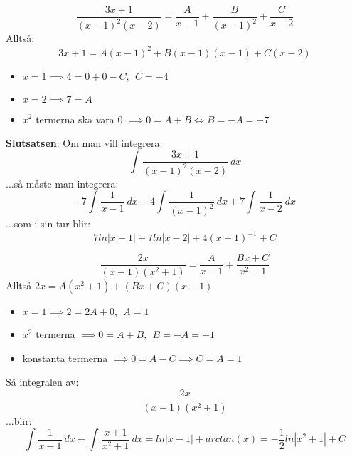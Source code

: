 \documentclass{report}
\begin{document}
\pagebreak

\ex{}
{
\begin{equation*}
\frac{3x+1}{(x-1)^2(x-2)} = \frac{A}{x-1} + \frac{B}{(x-1)^2} + \frac{C}{x-2} 
\end{equation*}
Alltså:
\begin{equation*}
3x+1 = A(x-1)^2+B(x-1)(x-1)+C(x-2)
\end{equation*}
\begin{itemize}
	\item $ x = 1 \implies 4 = 0 + 0 - C, \:\: C = -4$\\
	\item $ x = 2 \implies 7 = A $
	\item $ x^2 $ termerna ska vara 0 $ \implies 0 = A+B \iff B=-A = -7 $
\end{itemize}
\textbf{Slutsatsen}: Om man vill integrera:
\begin{equation*}
\int_{}^{} \frac{3x+1}{(x-1)^2(x-2)}  \: dx 
\end{equation*}
...så måste man integrera:
\begin{equation*}
-7 \int_{}^{} \frac{1}{x-1}  \: dx - 4 \int_{}^{} \frac{1}{(x-1)^2}  \: dx + 7 \int_{}^{} \frac{1}{x-2}  \: dx   
\end{equation*}
...som i sin tur blir:
\begin{equation*}
7ln|x-1|+7ln|x-2| + 4(x-1)^{-1} + C
\end{equation*}

}

\ex{}
{
\begin{equation*}
\frac{2x}{(x-1)(x^2+1)} = \frac{A}{x-1} + \frac{Bx+C}{x^2+1}  
\end{equation*}
Alltså $ 2x = A(x^2+1) + (Bx+C)(x-1)$
\begin{itemize}
	\item $ x = 1 \implies 2 = 2A + 0,\:\: A = 1 $
	\item $ x^2 $ termerna $ \implies 0 = A + B,\:\: B = -A = -1 $
	\item konstanta termerna $ \implies 0 = A - C \implies C = A = 1 $  
\end{itemize}
Så integralen av:
\begin{equation*}
\frac{2x}{(x-1)(x^2+1)} 
\end{equation*}
...blir:
\begin{equation*}
\int_{}^{} \frac{1}{x-1}  \: dx - \int_{}^{} \frac{x+1}{x^2+1}  \: dx = ln|x-1| +arctan(x) = - \frac{1}{2} ln|x^2+1| + C 
\end{equation*}
}
\end{document}
